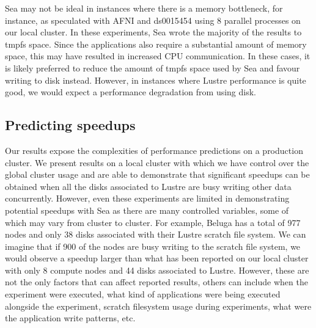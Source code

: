     Sea may not be ideal in instances where there is a memory bottleneck, for instance, as speculated
    with AFNI and ds0015454 using 8 parallel processes on our local cluster. In these experiments, Sea wrote the majority of the results to tmpfs space.
    Since the applications also require a substantial amount of memory space,
    this may have resulted in increased CPU communication. In these cases, it
    is likely preferred to reduce the amount of tmpfs space used by Sea and
    favour writing to disk instead. However, in instances where Lustre
    performance is quite good, we would expect a performance degradation from
    using disk.


    \subsection{Predicting speedups}

    Our results expose the complexities of performance predictions on a production cluster. We present results on a local cluster with which we
    have control over the global cluster usage and are able to demonstrate that
    significant speedups can be obtained when all the disks associated to Lustre
    are busy writing other data concurrently. However, even these experiments
    are limited in demonstrating potential speedups with Sea as there are many
    controlled variables, some of which may vary from cluster to cluster. For
    example, Beluga has a total of 977 nodes and only 38 disks associated with
    their Lustre scratch file system. We can imagine that if 900 of the nodes
    are busy writing to the scratch file system, we would observe a speedup
    larger than what has been reported on our local cluster with only 8 compute
    nodes and 44 disks associated to Lustre. However, these are not the only
    factors that can affect reported results, others can include when the
    experiment were executed, what kind of applications were being executed
    alongside the experiment, scratch filesystem usage during experiments, 
    what were the application write patterns, etc.


